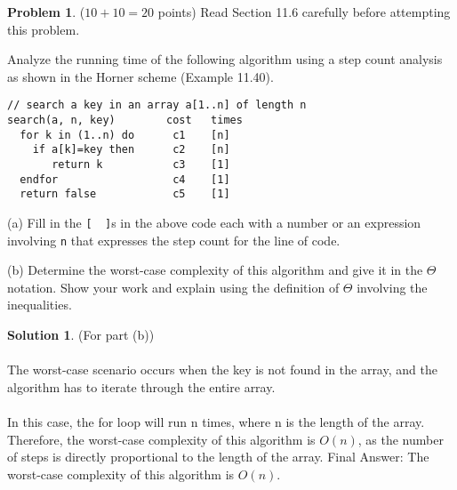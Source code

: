 \documentclass{article}
\theoremstyle{definition}
\newtheorem{problem}{Problem}
\newtheorem*{solution}{Solution}
\begin{document}
\newpage
\begin{problem} ($10+10=20$ points) Read Section 11.6 carefully before attempting 
this problem.

Analyze the running time of the following algorithm using a step count analysis 
as shown in the Horner scheme (Example 11.40).  
\begin{verbatim}
// search a key in an array a[1..n] of length n
search(a, n, key)        cost   times
  for k in (1..n) do      c1    [n]   
    if a[k]=key then      c2    [n]
       return k           c3    [1]
  endfor                  c4    [1]
  return false            c5    [1]
\end{verbatim}
(a) Fill in the \verb|[  ]|s in the above code each with a number or an expression involving
\verb|n| that expresses the step count for the line of code.

\medskip
\noindent
(b) Determine the worst-case complexity of this algorithm and give it in the $\Theta$ notation.
Show your work and explain using the definition of $\Theta$ involving the inequalities. 
\end{problem}
\begin{solution} (For part (b))
  ~\\
  ~\\
  The worst-case scenario occurs when the key is not found in the array, and the algorithm has to iterate through the entire array.
  ~\\
  ~\\
  In this case, the for loop will run n times, where n is the length of the array.
  Therefore, the worst-case complexity of this algorithm is $O(n)$, as the number of steps is directly proportional to the length of the array. Final Answer: The worst-case complexity of this algorithm is $O(n)$.
\end{solution}
\end{document}
